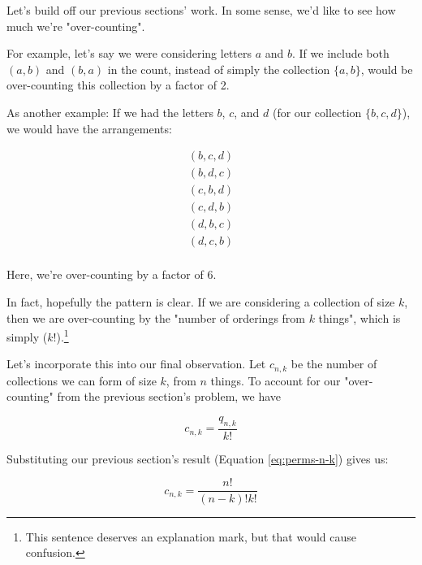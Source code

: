 
Let's build off our previous sections' work. In some sense, we'd like to see how much we're "over-counting". 

For example, let's say we were considering letters $a$ and $b$. If we include both $(a, b)$ and $(b, a)$ in the count, instead of simply the collection $\{a, b\}$, would be over-counting this collection by a factor of 2. 

As another example: If we had the letters $b$, $c$, and $d$ (for our collection $\{b, c, d\}$), we would have the arrangements:

\begin{gather*}
(b, c, d) \\
(b, d, c) \\
(c, b, d) \\
(c, d, b) \\
(d, b, c) \\
(d, c, b) \\
\end{gather*}

Here, we're over-counting by a factor of 6.


In fact, hopefully the pattern is clear. If we are considering a collection of size $k$, then we are over-counting by the "number of orderings from $k$ things", which is simply ($k!$).\footnote{This sentence deserves an explanation mark, but that would cause confusion.} 

Let's incorporate this into our final observation. Let $c_{n,k}$ be the number of collections we can form of size $k$, from $n$ things. To account for our "over-counting" from the previous section's problem, we have

\begin{equation*}
c_{n,k} = \frac{q_{n,k}}{k!}
\end{equation*}

Substituting our previous section's result (Equation \ref{eq:perms-n-k}) gives us:

\begin{equation}
c_{n,k} = \frac{n!}{(n-k)! k!}
\end{equation}

